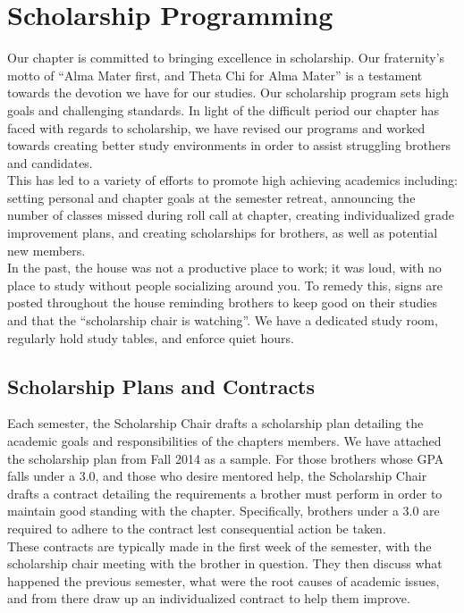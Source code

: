\chapter{Scholarship Programming}

  Our chapter is committed to bringing excellence in scholarship. Our fraternity's motto of ``Alma Mater first, and Theta Chi for Alma Mater'' is a testament towards the devotion we have for our studies. Our scholarship program sets high goals and challenging standards. In light of the difficult period our chapter has faced with regards to scholarship, we have revised our programs and worked towards creating better study environments in order to assist struggling brothers and candidates. \\ 

  This has led to a variety of efforts to promote high achieving academics including: setting personal and chapter goals at the semester retreat, announcing the number of classes missed during roll call at chapter, creating individualized grade improvement plans, and creating scholarships for brothers, as well as potential new members. \\

  In the past, the house was not a productive place to work; it was loud, with no place to study without people socializing around you. To remedy this, signs are posted throughout the house reminding brothers to keep good on their studies and that the ``scholarship chair is watching''. We have a dedicated study room, regularly hold study tables, and enforce quiet hours.
  
  \section*{Scholarship Plans and Contracts}
    Each semester, the Scholarship Chair drafts a scholarship plan detailing the academic goals and responsibilities of the chapters members. We have attached the scholarship plan from Fall 2014 as a sample. For those brothers whose GPA falls under a 3.0, and those who desire mentored help, the Scholarship Chair drafts a contract detailing the requirements a brother must perform in order to maintain good standing with the chapter. Specifically, brothers under a 3.0 are required to adhere to the contract lest consequential action be taken. \\

    These contracts are typically made in the first week of the semester, with the scholarship chair meeting with the brother in question. They then discuss what happened the previous semester, what were the root causes of academic issues, and from there draw up an individualized contract to help them improve. \\

